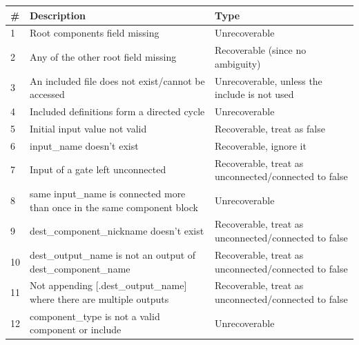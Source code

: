 \documentclass[a4paper]{article}
\begin{document}
        \begin{table}[h]
            \centering
            \begin{tabular}{p{0.5cm}p{8cm}p{4cm}}
                \toprule
                \#     & Description                                                              & Type                                                 \\ \midrule
                1      & Root components field missing                                            & Unrecoverable                                        \\
                2      & Any of the other root field missing                                      & Recoverable (since no ambiguity)                     \\
                3      & An included file does not exist/cannot be accessed                       & Unrecoverable, unless the include is not used        \\
                4      & Included definitions form a directed cycle                               & Unrecoverable                                        \\
                5      & Initial input value not valid                                            & Recoverable, treat as false                          \\
                6      & input\_name doesn't exist                                                & Recoverable, ignore it                               \\
                7      & Input of a gate left unconnected                                         & Recoverable, treat as unconnected/connected to false \\
                8      & same input\_name is connected more than once in the same component block & Unrecoverable                                        \\
                9      & dest\_component\_nickname doesn't exist                                  & Recoverable, treat as unconnected/connected to false \\
                10     & dest\_output\_name is not an output of dest\_component\_name             & Recoverable, treat as unconnected/connected to false \\
                11     & Not appending {[}.dest\_output\_name{]} where there are multiple outputs & Recoverable, treat as unconnected/connected to false \\
                12     & component\_type is not a valid component or include                      & Unrecoverable                                        \\

\end{tabular}
\end{table}
\end{document}
